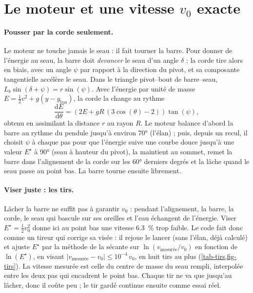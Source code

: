
\section{Le moteur et une vitesse \texorpdfstring{\(v_0\)}{v0} exacte}
\label{sec-moteur}

\paragraph{Pousser par la corde seulement.} Le moteur ne touche jamais le seau :
il fait tourner la barre. Pour donner de l'énergie au seau, la barre doit
\emph{devancer} le seau d'un angle \(\delta\) ; la corde tire alors en biais,
avec un angle \(\psi\) par rapport à la direction du pivot, et sa composante
tangentielle accélère le seau. Dans le triangle pivot--bout de barre--seau,
\(L_b \sin(\delta + \psi) = r \sin(\psi)\). Avec l'énergie par unité de masse
\(E = \tfrac12 v^2 + g (y - y_{\text{bas}})\), la corde la change au rythme
\begin{equation}
  \frac{\mathrm{d}E}{\mathrm{d}\theta} = \left(2E + gR\,(3 \cos(\theta) - 2)\right) \tan(\psi),
  \label{eq-energie}
\end{equation}
obtenu en assimilant la distance \(r\) au rayon \(R\). Le moteur balance d'abord
la barre au rythme du pendule jusqu'à environ \ang{70} (l'élan) ; puis, depuis un
recul, il choisit \(\psi\) à chaque pas pour que l'énergie suive une courbe
douce jusqu'à une valeur \(E^\star\) à \ang{90} (seau à hauteur du pivot), la maintient au sommet, remet la
barre dans l'alignement de la corde sur les \ang{60} derniers degrés et la lâche
quand le seau passe au point bas. La barre tourne ensuite librement.

\paragraph{Viser juste : les tirs.} Lâcher la barre ne suffit pas à garantir
\(v_0\) : pendant l'alignement, la barre, la corde, le seau qui bascule sur ses
oreilles et l'eau échangent de l'énergie. Viser \(E^\star = \tfrac12 v_0^2\)
donne ici au point bas une vitesse \SI{6,3}{\percent} trop faible. Le code fait
donc comme un tireur qui corrige sa visée : il rejoue le lancer (sans l'élan,
déjà calculé) et ajuste \(E^\star\) par la méthode de la sécante sur
\(\ln(v_{\text{mesurée}}/v_0)\) en fonction de \(\ln(E^\star)\), en visant
\(|v_{\text{mesurée}} - v_0| \leq 10^{-4}\, v_0\), en huit tirs au plus
(\cref{tab-tirs,fig-tirs}). La vitesse mesurée est celle du centre de masse du
seau rempli, interpolée entre les deux pas qui encadrent le point bas. Chaque tir
ne va que jusqu'au lâcher, donc il coûte peu ; le tir gardé continue ensuite
comme essai réel.

